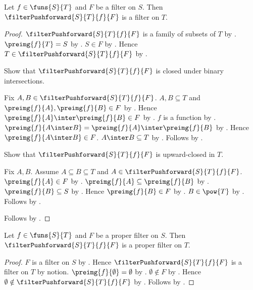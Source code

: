 \begin{classification}\label{filter_pushforward_is_filter}
    Let $f\in\funs{S}{T}$ and $F$ be a filter on $S$.
    Then $\filterPushforward{S}{T}{f}{F}$ is a filter on $T$.
\end{classification}
\begin{proof}
    $\filterPushforward{S}{T}{f}{F}$ is a family of subsets of $T$ by
        .
    $\preimg{f}{T}=S$ by .
    $S\in F$ by .
    Hence $T\in\filterPushforward{S}{T}{f}{F}$ by
        .

    Show that $\filterPushforward{S}{T}{f}{F}$ is closed under binary
        intersections.
    \begin{subproof}
        Fix $A,B\in\filterPushforward{S}{T}{f}{F}$.
        $A,B\subseteq T$ and $\preimg{f}{A},\preimg{f}{B}\in F$ by
            .
        Hence $\preimg{f}{A}\inter\preimg{f}{B}\in F$ by .
        $f$ is a function by .
        $\preimg{f}{A\inter B}
            =\preimg{f}{A}\inter\preimg{f}{B}$ by
            .
        Hence $\preimg{f}{A\inter B}\in F$.
        $A\inter B\subseteq T$ by .
        Follows by .
    \end{subproof}

    Show that $\filterPushforward{S}{T}{f}{F}$ is upward-closed in $T$.
    \begin{subproof}
        Fix $A,B$.
        Assume $A\subseteq B\subseteq T$ and
            $A\in\filterPushforward{S}{T}{f}{F}$.
        $\preimg{f}{A}\in F$ by .
        $\preimg{f}{A}\subseteq\preimg{f}{B}$ by .
        $\preimg{f}{B}\subseteq S$ by
            .
        Hence $\preimg{f}{B}\in F$ by .
        $B\in\pow{T}$ by .
        Follows by .
    \end{subproof}
    Follows by .
\end{proof}

\begin{theorem}\label{filter_pushforward_preserves_properness}
    Let $f\in\funs{S}{T}$ and $F$ be a proper filter on $S$.
    Then $\filterPushforward{S}{T}{f}{F}$ is a proper filter on $T$.
\end{theorem}
\begin{proof}
    $F$ is a filter on $S$ by .
    Hence $\filterPushforward{S}{T}{f}{F}$ is a filter on $T$ by notion.
    $\preimg{f}{\emptyset}=\emptyset$ by
        .
    $\emptyset\notin F$ by .
    Hence $\emptyset\notin\filterPushforward{S}{T}{f}{F}$ by
        .
    Follows by .
\end{proof}

